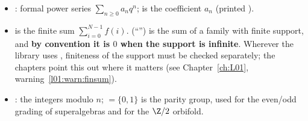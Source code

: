 \begin{itemize}
  .
\item {}: formal power series $\sum_{n\ge0}a_nq^n$; 
  is the coefficient $a_n$ (printed ).
\item {} is the finite sum $\sum_{i=0}^{N-1}f(i)$. 
  (``'') is the sum of a family with finite support, and \textbf{by convention it is $0$
  when the support is infinite}. Wherever the library uses , finiteness of the support must
  be checked separately; the chapters point this out where it matters (see
  Chapter~\ref{ch:L01}, warning~\ref{l01:warn:finsum}).
\item {}: the integers modulo $n$;  $=\{0,1\}$ is the parity group, used for
  the even/odd grading of superalgebras and for the $\Z/2$ orbifold.
\end{itemize}

